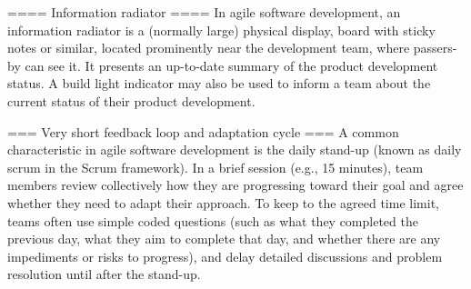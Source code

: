 ==== Information radiator ====
In agile software development, an information radiator is a (normally large) physical display, board with sticky notes or similar, located prominently near the development team, where passers-by can see it. It presents an up-to-date summary of the product development status. A build light indicator may also be used to inform a team about the current status of their product development.


=== Very short feedback loop and adaptation cycle ===
A common characteristic in agile software development is the daily stand-up (known as daily scrum in the Scrum framework). In a brief session (e.g., 15 minutes), team members review collectively how they are progressing toward their goal and agree whether they need to adapt their approach. To keep to the agreed time limit, teams often use simple coded questions (such as what they completed the previous day, what they aim to complete that day, and whether there are any impediments or risks to progress), and delay detailed discussions and problem resolution until after the stand-up.
